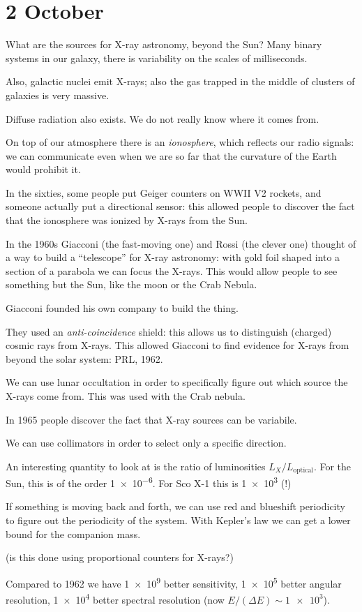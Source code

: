 \documentclass[main.tex]{subfiles}
\begin{document}
\section*{2 October}

What are the sources for X-ray astronomy, beyond the Sun? Many binary systems in our galaxy, there is variability on the scales of milliseconds.

Also, galactic nuclei emit X-rays; also the gas trapped in the middle of clusters of galaxies is very massive.

Diffuse radiation also exists. We do not really know where it comes from.

On top of our atmosphere there is an \emph{ionosphere}, which reflects our radio signals: we can communicate even when we are so far that the curvature of the Earth would prohibit it.

In the sixties, some people put Geiger counters on WWII V2 rockets, and someone actually put a directional sensor: this allowed people to discover the fact that the ionosphere was ionized by X-rays from the Sun.

In the 1960s Giacconi (the fast-moving one) and Rossi (the clever one) thought of a way to build a ``telescope'' for X-ray astronomy: with gold foil shaped into a section of a parabola we can focus the X-rays.
This would allow people to see something but the Sun, like the moon or the Crab Nebula.

Giacconi founded his own company to build the thing.

They used an \emph{anti-coincidence} shield: this allows us to distinguish (charged) cosmic rays from X-rays.
This allowed Giacconi to find evidence for X-rays from beyond the solar system: PRL, 1962.

We can use lunar occultation in order to specifically figure out which source the X-rays come from. This was used with the Crab nebula.

In 1965 people discover the fact that X-ray sources can  be variabile.

We can use collimators in order to select only a specific direction.

An interesting quantity to look at is the ratio of luminosities \(L_X / L_{\text{optical}}\). For the Sun, this is of the order \num{1e-6}. For Sco X-1 this is \num{1e3} (!)

If something is moving back and forth, we can use red and blueshift periodicity to figure out the periodicity of the system.
With Kepler's law we can get a lower bound for the companion mass.

\begin{greenbox}
    (is this done using proportional counters for X-rays?)
\end{greenbox}

Compared to 1962 we have \num{1e9} better sensitivity, \num{1e5} better angular resolution, \num{1e4} better spectral resolution (now \(E / (\Delta E ) \sim \num{1e3} \)).
\end{document}
